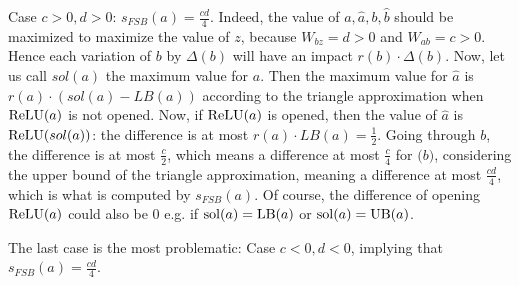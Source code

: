 Case $c>0,d>0$: $s_{FSB}(a)=\frac{cd}{4}$.
Indeed, the value of $a,\hat{a},b,\hat{b}$ should be maximized to maximize the value of $z$, because $W_{bz}=d>0$ and $W_{ab}=c>0$. Hence each variation of $b$ by $\Delta(b)$ will have an impact $r(b) \cdot \Delta(b)$.
Now, let us call $sol(a)$ the maximum value for $a$.
Then the maximum value for $\hat{a}$ is $r(a)\cdot (sol(a)-LB(a))$ according to the triangle approximation when $\mathrm{ReLU}(a)$ is not opened. Now, if $\mathrm{ReLU}(a)$ is opened, then 
the value of $\hat{a}$ is $\mathrm{ReLU}(sol(a))$: the difference is at most $r(a) \cdot LB(a) = \frac{1}{2}$. Going through $b$, the difference is at most $\frac{c}{2}$, which means a difference at most $\frac{c}{4}$ for $\hat(b)$, considering the upper bound of the triangle approximation, meaning a difference at most $\frac{cd}{4}$, which is what is computed by 
$s_{FSB}(a)$. Of course, the difference of opening $\mathrm{ReLU}(a)$ could also be 0 e.g. if $\mathrm{sol}(a)=\mathrm{LB}(a)$ or $\mathrm{sol}(a)=\mathrm{UB}(a)$.

The last case is the most problematic: 
Case $c<0,d<0$, implying that $s_{FSB}(a)=\frac{cd}{4}$.


